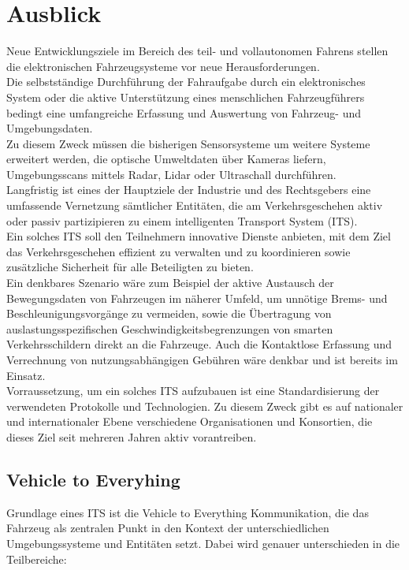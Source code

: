 \section{Ausblick}

    Neue Entwicklungsziele im Bereich des teil- und vollautonomen Fahrens stellen die elektronischen Fahrzeugsysteme vor neue Herausforderungen.\\
    Die selbstständige Durchführung der Fahraufgabe durch ein elektronisches System oder die aktive Unterstützung eines menschlichen Fahrzeugführers
    bedingt eine umfangreiche Erfassung und Auswertung von Fahrzeug- und Umgebungsdaten.\\
    Zu diesem Zweck müssen die bisherigen Sensorsysteme um weitere Systeme erweitert werden, die optische Umweltdaten über Kameras liefern, Umgebungsscans
    mittels Radar, Lidar oder Ultraschall durchführen. ~\cite{BP06}\\

    Langfristig ist eines der Hauptziele der Industrie und des Rechtsgebers eine umfassende Vernetzung
    sämtlicher Entitäten, die am Verkehrsgeschehen aktiv oder passiv partizipieren zu einem intelligenten
    Transport System (ITS).\\
    Ein solches ITS soll den Teilnehmern innovative Dienste anbieten, mit dem Ziel das Verkehrsgeschehen
    effizient zu verwalten und zu koordinieren sowie zusätzliche Sicherheit für alle Beteiligten zu bieten. ~\cite{BP04}\\

    Ein denkbares Szenario wäre zum Beispiel der aktive Austausch der Bewegungsdaten von Fahrzeugen im näherer Umfeld, um unnötige Brems-
    und Beschleunigungsvorgänge zu vermeiden, sowie die Übertragung von auslastungsspezifischen Geschwindigkeitsbegrenzungen von smarten Verkehrsschildern
    direkt an die Fahrzeuge. Auch die Kontaktlose Erfassung und Verrechnung von nutzungsabhängigen Gebühren wäre denkbar und ist bereits im Einsatz.\\

    Vorraussetzung, um ein solches ITS aufzubauen ist eine Standardisierung der verwendeten Protokolle und Technologien.
    Zu diesem Zweck gibt es auf nationaler und internationaler Ebene verschiedene Organisationen und Konsortien,
    die dieses Ziel seit mehreren Jahren aktiv vorantreiben.\\

    \subsection{Vehicle to Everyhing}
    Grundlage eines ITS ist die Vehicle to Everything Kommunikation, die das Fahrzeug als zentralen Punkt in den
    Kontext der unterschiedlichen Umgebungssysteme und Entitäten setzt. Dabei wird genauer unterschieden in die Teilbereiche:
    
